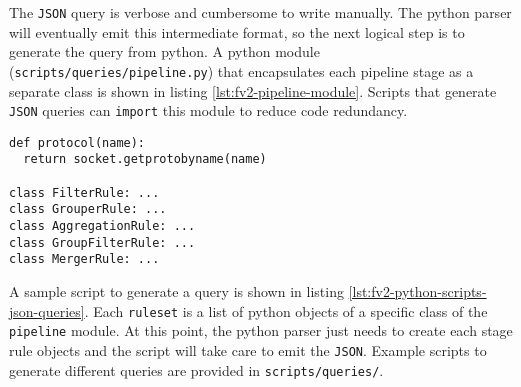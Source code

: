 The \texttt{JSON} query is verbose and cumbersome to write manually. The
python parser will eventually emit this intermediate format, so the next
logical  step is to generate
the query from python. A python module (\texttt{scripts/queries/pipeline.py})
that encapsulates each pipeline stage as a separate class is shown in listing
\ref{lst:fv2-pipeline-module}.  Scripts that generate \texttt{JSON} queries
can \texttt{import} this module to reduce code redundancy.

\begin{lstlisting}
def protocol(name):
  return socket.getprotobyname(name)

class FilterRule: ...
class GrouperRule: ...
class AggregationRule: ...
class GroupFilterRule: ...
class MergerRule: ...
\end{lstlisting}

A sample script to generate a query is shown in listing
\ref{lst:fv2-python-scripts-json-queries}. Each \texttt{ruleset} is a list of
python objects of a specific class of the \texttt{pipeline} module. At this
point,  the python parser just needs to create each
stage rule objects and the script will take care to emit the \texttt{JSON}.
Example scripts to generate different queries are provided in
\texttt{scripts/queries/}.


